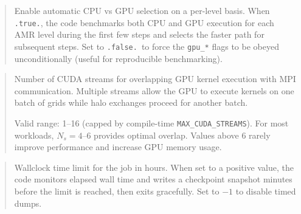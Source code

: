 \label{param:gpu_auto_tune}

\begin{quote}
Enable automatic CPU vs GPU selection on a per-level basis.  When
\texttt{.true.}, the code benchmarks both CPU and GPU execution for
each AMR level during the first few steps and selects the faster path
for subsequent steps.  Set to \texttt{.false.}\ to force the
\texttt{gpu\_*} flags to be obeyed unconditionally (useful for
reproducible benchmarking).

\end{quote}

\label{param:n_cuda_streams}

\begin{quote}
Number of CUDA streams for overlapping GPU kernel execution with MPI
communication.  Multiple streams allow the GPU to execute kernels on
one batch of grids while halo exchanges proceed for another batch.

Valid range: 1--16 (capped by compile-time \texttt{MAX\_CUDA\_STREAMS}).
For most workloads, $N_s = 4$--6 provides optimal overlap.  Values
above 6 rarely improve performance and increase GPU memory usage.

\end{quote}

\label{param:walltime_hrs}

\begin{quote}
Wallclock time limit for the job in hours.  When set to a positive
value, the code monitors elapsed wall time and writes a checkpoint
snapshot  minutes before the limit is reached,
then exits gracefully.  Set to $-1$ to disable timed dumps.

\end{quote}

